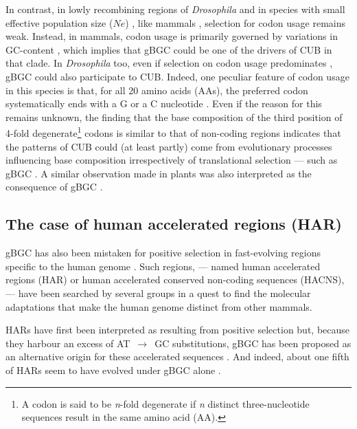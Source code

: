 In contrast, in lowly recombining regions of \textit{Drosophila} \citep{kliman1993reduced} and in species with small effective population size ($Ne$) \citep{subramanian2008nearly,galtier2018codon}, like mammals \citep{urrutia2003signature,comeron2004selective,lavner2005codon}, selection for codon usage remains weak.
Instead, in mammals, codon usage is primarily governed by variations in GC-content \citep{semon2006no,rudolph2016codondriven,pouyet2017recombination}, which implies that gBGC could be one of the drivers of CUB in that clade.
In \textit{Drosophila} too, even if selection on codon usage predominates \citep{zeng2009estimating,zeng2010studying,zeng2010simple}, gBGC could also participate to CUB\@.
Indeed, one peculiar feature of codon usage in this species is that, for all 20 amino acids (AAs), the preferred codon systematically ends with a G or a C nucleotide \citep[reviewed in][]{duret2009biased}.
Even if the reason for this remains unknown, the finding that the base composition of the third position of 4-fold degenerate\footnote{A codon is said to be \textit{n}-fold degenerate if \textit{n} distinct three-nucleotide sequences result in the same amino acid (AA).} codons is similar to that of non-coding regions \citep{clay2011gc3} indicates that the patterns of CUB could (at least partly) come from evolutionary processes influencing base composition irrespectively of translational selection — such as gBGC \citep[but see \citealp{jackson2017variation}]{duret2002evolution,galtier2006gcbiased,lynch2007origins}. 
A similar observation made in plants was also interpreted as the consequence of gBGC \citep{clement2017evolutionary}.




\subsection{The case of human accelerated regions (HAR)}

gBGC has also been mistaken for positive selection in fast-evolving regions specific to the human genome \citep[reviewed in][]{duret2009biased}.
Such regions, — named human accelerated regions (HAR) or human accelerated conserved non-coding sequences (HACNS), — have been searched by several groups \citep{pollard2006forces,pollard2006rna,prabhakar2006accelerated,bird2007fastevolving,bush2008genomewide,lindblad-toh2011highresolution} in a quest to find the molecular adaptations that make the human genome distinct from other mammals.

HARs have first been interpreted as resulting from positive selection \citep[reviewed in][]{hubisz2014exploring} but, because they harbour an excess of AT~$\rightarrow$~GC substitutions, gBGC has been proposed as an alternative origin for these accelerated sequences \citep{galtier2007adaptation,berglund2009hotspots,duret2009comment,katzman2010gcbiased,ratnakumar2010detecting}.
And indeed, about one fifth of HARs seem to have evolved under gBGC alone \citep{kostka2012role}.\\


